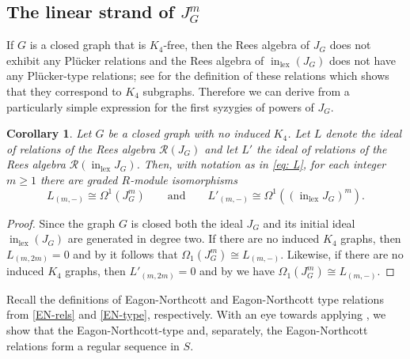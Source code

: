 \documentclass[reqno]{amsart}
\newtheorem{cor}[thm]{Corollary}
\theoremstyle{definition}
\theoremstyle{remark}
\numberwithin{equation}{section}
\DeclareMathOperator{\init}{in}
\DeclareMathOperator{\lex}{lex}
\begin{document}
\subsection{The linear strand of $J_G^m$}

If $G$ is a closed graph that is $K_4$-free, then the Rees algebra of $J_G$ does not exhibit any Pl\"ucker relations and the  Rees algebra of $\init_{\lex}(J_G)$ does not have any Pl\"ucker-type relations; see  for the definition of these relations which shows that they correspond to $K_4$ subgraphs. Therefore we can derive from  a particularly simple expression for the first syzygies of powers of $J_G$.

\begin{cor}
\label{no k_4 iso}
Let $G$ be a closed graph with no induced $K_4$. Let $L$ denote the ideal of relations of the Rees algebra $\mathcal{R}(J_G)$  and let $L'$ the ideal of relations of the Rees algebra $\mathcal{R}(\init_{\lex} J_G)$. Then, with notation as in \eqref{eq: L}, for each integer $m\geq 1$ there are graded $R$-module isomorphisms 
\[
L_{(m,-)}\cong\Omega^1(J_G^m) \qquad \text{and} \qquad L'_{(m,-)}\cong\Omega^1((\init_{\lex} J_G)^m).
\]
\end{cor}
\begin{proof}
    Since the graph $G$ is closed both the ideal $J_G$ and its initial ideal $\init_{\lex}(J_G)$ are generated in degree two. If there are no induced $K_4$ graphs, then $L_{(m,2m)}=0$ and by  it follows that $\Omega_1(J_G^m) \cong L_{(m,-)}$.  Likewise, if there are no induced $K_4$ graphs, then $L'_{(m,2m)}=0$ and by  we have $\Omega_1(J_G^m) \cong L_{(m,-)}$. 
\end{proof}


Recall the definitions of Eagon-Northcott  and Eagon-Northcott type relations from \eqref{EN-rels} and \eqref{EN-type}, respectively. With an eye towards applying , we show that the Eagon-Northcott-type and, separately, the  Eagon-Northcott relations form a regular sequence in $S$.
\end{document}
